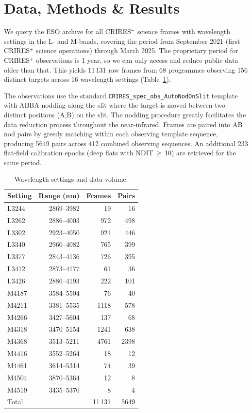 \documentclass{aa}
\newcommand{\crires}{CRIRES$^+$}
\begin{document}
\section{Data,  Methods \& Results}
\label{sec:data-methods}

We query the ESO archive for all \crires{} science frames with
wavelength settings in the L- and M-bands, covering the period from
September 2021 (first \crires{} science operations) through March 2025. The proprietary
period for \crires{} observations is 1 year, so we can only access and reduce
public data older than that.
This yields 11\,131 raw frames from 68 programmes observing 156 distinct
targets across 16 wavelength settings (Table~\ref{tab:settings}).

The observations use the standard \texttt{CRIRES\_spec\_obs\_AutoNodOnSlit}
template with ABBA nodding along the slit where the target is moved between two
distinct positions (A,B) on the slit. The nodding procedure greatly facilitates
the data reduction process throughout the near-infrared. Frames are paired into AB
nod pairs by greedy matching within each observing template sequence,
producing 5649 pairs across 412 combined observing sequences. An
additional 233 flat-field calibration epochs (deep flats with
NDIT\,$\geq$\,10) are retrieved for the same period.

\begin{table}
\caption{Wavelength settings and data volume.}
\label{tab:settings}
\centering
\begin{tabular}{lrrr}
\hline\hline
Setting & Range (nm) & Frames & Pairs \\
\hline
L3244 & 2869--3982 & 19 & 16 \\
L3262 & 2886--4003 & 972 & 498 \\
L3302 & 2923--4050 & 921 & 446 \\
L3340 & 2960--4082 & 765 & 399 \\
L3377 & 2843--4136 & 726 & 395 \\
L3412 & 2873--4177 & 61 & 36 \\
L3426 & 2886--4193 & 222 & 101 \\
\hline
M4187 & 3584--5504 & 76 & 40 \\
M4211 & 3381--5535 & 1118 & 578 \\
M4266 & 3427--5604 & 137 & 68 \\
M4318 & 3470--5154 & 1241 & 638 \\
M4368 & 3513--5211 & 4761 & 2398 \\
M4416 & 3552--5264 & 18 & 12 \\
M4461 & 3614--5314 & 74 & 39 \\
M4504 & 3870--5364 & 12 & 8 \\
M4519 & 3435--5370 & 8 & 4 \\
\hline
Total & & 11\,131 & 5649 \\
\hline
\end{tabular}
\end{table}
\end{document}
